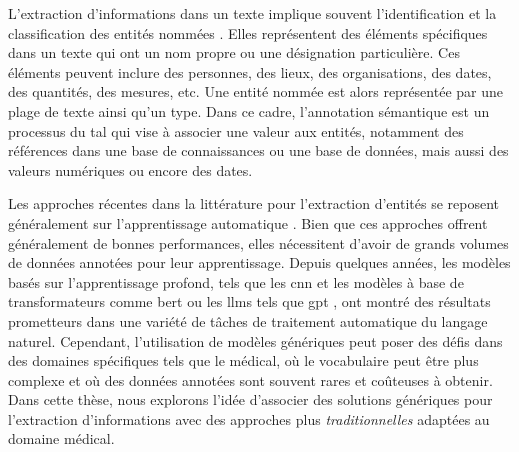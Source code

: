 L'extraction d'informations dans un texte implique souvent l'identification et la classification des entités nommées \cite{alshaikhdeebBiomedicalNamedEntity2016,goyalRecentNamedEntity2018,nasarNamedEntityRecognition2021}.
Elles représentent des éléments spécifiques dans un texte qui ont un nom propre ou une désignation particulière.
Ces éléments peuvent inclure des personnes, des lieux, des organisations, des dates, des quantités, des mesures, etc.
Une entité nommée est alors représentée par une plage de texte ainsi qu'un type.
Dans ce cadre, l'annotation sémantique est un processus du \gls{tal} qui vise à associer une valeur aux entités, notamment des références dans une base de connaissances ou une base de données, mais aussi des valeurs numériques ou encore des dates.

Les approches récentes dans la littérature pour l'extraction d'entités se reposent généralement sur l'apprentissage automatique \cite{nasarNamedEntityRecognition2021}.
Bien que ces approches offrent généralement de bonnes performances, elles nécessitent d'avoir de grands volumes de données annotées pour leur apprentissage.
Depuis quelques années, les modèles basés sur l'apprentissage profond, tels que les \gls{cnn} et les modèles à base de transformateurs comme \gls{bert} \cite{devlinBERTPretrainingDeep2019} ou les \glspl{llm} tels que \gls{gpt} \cite{radfordImprovingLanguageUnderstanding2018, brownLanguageModelsAre2020}, ont montré des résultats prometteurs dans une variété de tâches de traitement automatique du langage naturel.
Cependant, l'utilisation de modèles génériques peut poser des défis dans des domaines spécifiques tels que le médical, où le vocabulaire peut être plus complexe et où des données annotées sont souvent rares et coûteuses à obtenir.
Dans cette thèse, nous explorons l'idée d'associer des solutions génériques pour l'extraction d'informations avec des approches plus \emph{traditionnelles} adaptées au domaine médical.

